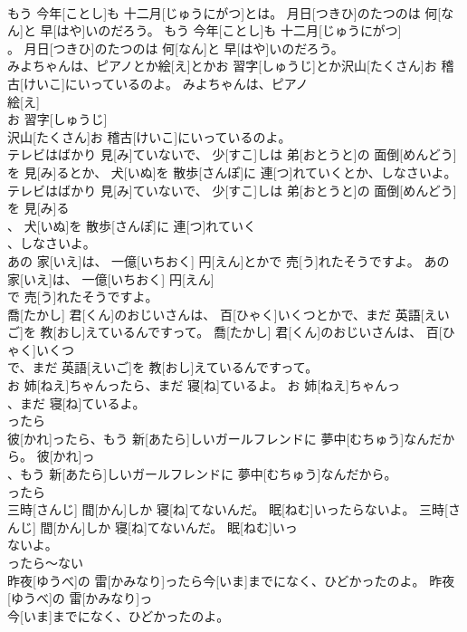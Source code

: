 \documentclass[8pt]{extreport}
\begin{document}
\begin{CJK}{UTF8}{min}
\\	もう 今年[ことし]も 十二月[じゅうにがつ]とは。 月日[つきひ]のたつのは 何[なん]と 早[はや]いのだろう。	もう 今年[ことし]も 十二月[じゅうにがつ]
\\	。 月日[つきひ]のたつのは 何[なん]と 早[はや]いのだろう。	
\\	みよちゃんは、ピアノとか絵[え]とかお 習字[しゅうじ]とか沢山[たくさん]お 稽古[けいこ]にいっているのよ。	みよちゃんは、ピアノ
\\	絵[え]
\\	お 習字[しゅうじ]
\\	沢山[たくさん]お 稽古[けいこ]にいっているのよ。	
\\	テレビはばかり 見[み]ていないで、 少[すこ]しは 弟[おとうと]の 面倒[めんどう]を 見[み]るとか、 犬[いぬ]を 散歩[さんぽ]に 連[つ]れていくとか、しなさいよ。	テレビはばかり 見[み]ていないで、 少[すこ]しは 弟[おとうと]の 面倒[めんどう]を 見[み]る
\\	、 犬[いぬ]を 散歩[さんぽ]に 連[つ]れていく
\\	、しなさいよ。	
\\	あの 家[いえ]は、 一億[いちおく] 円[えん]とかで 売[う]れたそうですよ。	あの 家[いえ]は、 一億[いちおく] 円[えん]
\\	で 売[う]れたそうですよ。	
\\	喬[たかし] 君[くん]のおじいさんは、 百[ひゃく]いくつとかで、まだ 英語[えいご]を 教[おし]えているんですって。	喬[たかし] 君[くん]のおじいさんは、 百[ひゃく]いくつ
\\	で、まだ 英語[えいご]を 教[おし]えているんですって。	
\\	お 姉[ねえ]ちゃんったら、まだ 寝[ね]ているよ。	お 姉[ねえ]ちゃんっ
\\	、まだ 寝[ね]ているよ。	
\\	ったら
\\	彼[かれ]ったら、もう 新[あたら]しいガールフレンドに 夢中[むちゅう]なんだから。	彼[かれ]っ
\\	、もう 新[あたら]しいガールフレンドに 夢中[むちゅう]なんだから。	
\\	ったら
\\	三時[さんじ] 間[かん]しか 寝[ね]てないんだ。 眠[ねむ]いったらないよ。	三時[さんじ] 間[かん]しか 寝[ね]てないんだ。 眠[ねむ]いっ
\\	ないよ。	
\\	ったら～ない
\\	昨夜[ゆうべ]の 雷[かみなり]ったら今[いま]までになく、ひどかったのよ。	昨夜[ゆうべ]の 雷[かみなり]っ
\\	今[いま]までになく、ひどかったのよ。	

\end{CJK}
\end{document}
